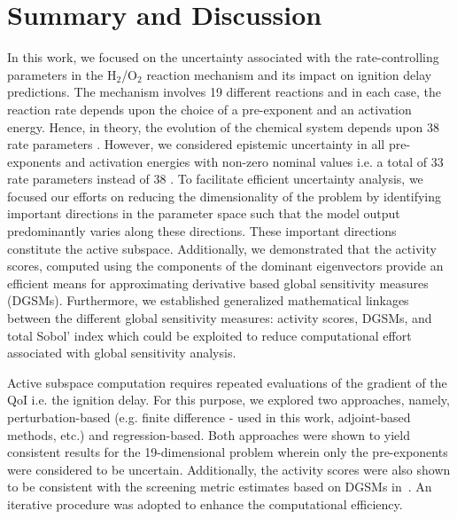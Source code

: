 \section{Summary and Discussion}
\label{sec:conc}
 
In this work, we focused on the uncertainty associated with the
rate-controlling parameters in the H$_2$/O$_2$ reaction mechanism
 and its
impact on ignition delay predictions. The mechanism involves 19 different
reactions and in each case, the reaction rate depends upon the choice of a
pre-exponent and an activation energy. Hence, in theory, the evolution of the
chemical system depends upon 38 rate parameters .
However, we considered 
epistemic uncertainty in all pre-exponents and activation energies with non-zero
nominal values i.e. a total of 33 rate parameters instead of 38 .  
To facilitate efficient uncertainty analysis, we focused our efforts on
reducing the dimensionality of the problem by identifying important directions
in the parameter space such that the model output 
predominantly varies along these directions. These important directions
constitute the active subspace. Additionally, we demonstrated that the activity scores,
computed using the components of the dominant eigenvectors provide an efficient
means for approximating derivative based global sensitivity measures (DGSMs).
Furthermore, we established generalized mathematical linkages between the
different global sensitivity measures: activity scores, DGSMs, and total Sobol'
index which could be exploited to reduce computational effort associated with
global sensitivity analysis. 
 
Active subspace computation requires repeated evaluations of the gradient of
the QoI i.e. the ignition delay. For this purpose, we explored two approaches,
namely, perturbation-based (e.g. finite difference - used in this work, adjoint-based
methods, etc.) and regression-based. Both approaches were shown to yield consistent
results for the 19-dimensional
problem wherein only the pre-exponents were considered to be uncertain.
Additionally, the activity scores were also shown to be consistent with the
screening metric estimates based on DGSMs in~\cite{Vohra:2018}. An
iterative procedure was adopted to enhance the computational efficiency. 

